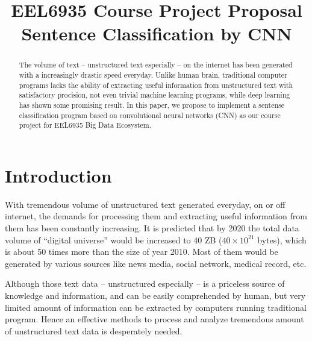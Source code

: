 \documentclass[conference]{IEEEtran}
\begin{document}
\title{EEL6935 Course Project Proposal \\
    Sentence Classification by CNN}
\author{
}

\maketitle

\begin{abstract}
    The volume of text -- unstructured text especially --  on the internet 
    has been generated with a increasingly drastic speed everyday. Unlike 
    human brain, traditional computer programs lacks the ability of extracting
    useful information from unstructured text with satisfactory procision, 
    not even trivial machine learning programs, while deep learning has shown 
    some promising result. In this paper, we propose to implement a sentense
    classification program based on convolutional neural networks (CNN) as 
    our course project for EEL6935 Big Data Ecosystem. 
\end{abstract}

\IEEEpeerreviewmaketitle

\section{Introduction}
    With tremendous volume of unstructured text generated everyday, on or off 
    internet, the demands for processing them and extracting useful information 
    from them has been constantly increasing. It is predicted that by 2020 the 
    total data volume of ``digital universe'' would be increased to 40 ZB 
    ($40\times 10^{21}$ bytes), which is about 50 times more than the size of 
    year 2010\cite{gantz2012digital}. Most of them would be generated by various 
    sources like news media, social network, medical record, etc. 
    
    Although those text data -- unstructured especially -- is a priceless source
    of knowledge and information, and can be easily comprehended by human, 
    but very limited amount of information can be extracted by computers running 
    traditional program. Hence an effective methods to process and analyze tremendous
    amount of unstructured text data is desperately needed.
    
\end{document}
